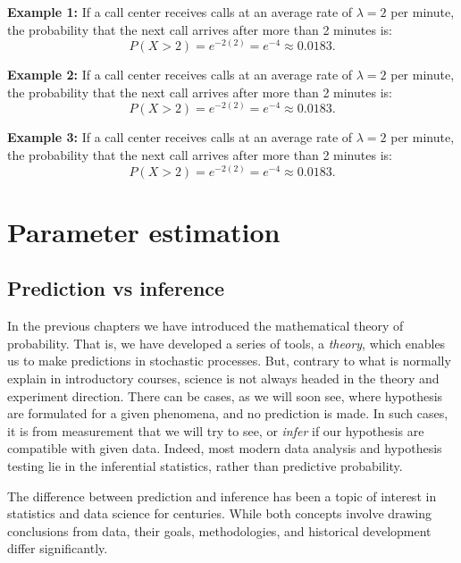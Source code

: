 \documentclass{book}
\begin{document}
\textbf{Example 1:} If a call center receives calls at an average rate of $\lambda = 2$ per minute, the probability that the next call arrives after more than 2 minutes is:
\begin{equation}
    P(X > 2) = e^{-2(2)} = e^{-4} \approx 0.0183.
\end{equation}

\textbf{Example 2:} If a call center receives calls at an average rate of $\lambda = 2$ per minute, the probability that the next call arrives after more than 2 minutes is:
\begin{equation}
    P(X > 2) = e^{-2(2)} = e^{-4} \approx 0.0183.
\end{equation}

\textbf{Example 3:} If a call center receives calls at an average rate of $\lambda = 2$ per minute, the probability that the next call arrives after more than 2 minutes is:
\begin{equation}
    P(X > 2) = e^{-2(2)} = e^{-4} \approx 0.0183.
\end{equation}

\chapter{Parameter estimation}

\section{Prediction vs inference}
In the previous chapters we have introduced the mathematical theory of probability. That is, we have developed a series of tools, a \textit{theory}, which enables us to make predictions in stochastic processes. But, contrary to what is normally explain in introductory courses, science is not always headed in the theory and experiment direction. There can be cases, as we will soon see, where hypothesis are formulated for a given phenomena, and no prediction is made. In such cases, it is from measurement that we will try to see, or \textit{infer} if our hypothesis are compatible with given data. Indeed, most modern data analysis and hypothesis testing lie in the inferential statistics, rather than predictive probability.

The difference between prediction and inference has been a topic of interest in statistics and data science for centuries. While both concepts involve drawing conclusions from data, their goals, methodologies, and historical development differ significantly.\\
\end{document}
